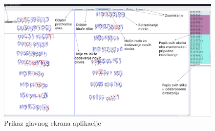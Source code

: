 \documentclass[times, utf8, diplomski]{fer}
\theoremstyle{definition}
\begin{document}
\begin{figure}[h]
\centering
\includegraphics[scale=0.2]{master_detail.png}
\caption{Prikaz glavnog ekrana aplikacije}
\end{figure}
\end{document}
